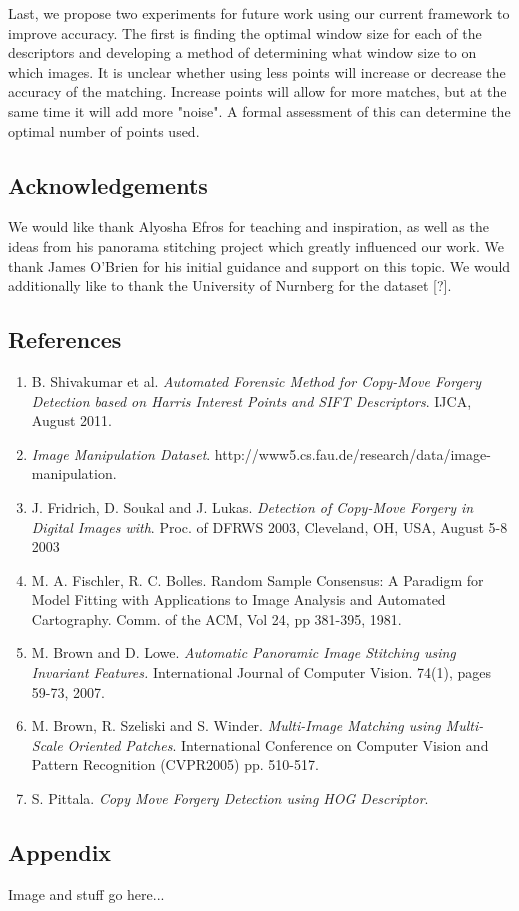 \documentclass[12pt]{article}
\begin{document}
Last, we propose two experiments for future work using our current framework to improve accuracy. The first is finding the optimal window size for each of the descriptors and developing a method of determining what window size to on which images. It is unclear whether using less points will increase or decrease the accuracy of the matching. Increase points will allow for more matches, but at the same time it will add more "noise". A formal assessment of this can determine the optimal number of points used. 

\subsection*{Acknowledgements}

We would like thank Alyosha Efros for teaching and inspiration, as well as the ideas from his panorama stitching project which greatly influenced our work. We thank James O'Brien for his initial guidance and support on this topic. We would additionally like to thank the University of Nurnberg for the dataset [?].

\subsection*{References}

\begin{enumerate}
\item B. Shivakumar et al. {\it Automated Forensic Method for Copy-Move Forgery Detection based on Harris Interest Points and SIFT Descriptors}. IJCA, August 2011. 
\item {\it Image Manipulation Dataset}. http://www5.cs.fau.de/research/data/image-manipulation. 
\item J. Fridrich, D. Soukal and J. Lukas. {\it Detection of Copy-Move Forgery in Digital Images with}. Proc. of DFRWS 2003, Cleveland, OH, USA, August 5-8 2003
\item M. A. Fischler, R. C. Bolles. Random Sample Consensus: A Paradigm for Model Fitting with Applications to Image Analysis and Automated Cartography. Comm. of the ACM, Vol 24, pp 381-395, 1981. 
\item M. Brown and D. Lowe. {\it Automatic Panoramic Image Stitching using Invariant Features.} International Journal of Computer Vision. 74(1), pages 59-73, 2007.
\item M. Brown, R. Szeliski and S. Winder. {\it Multi-Image Matching using Multi-Scale Oriented Patches}. International Conference on Computer Vision and Pattern Recognition (CVPR2005) pp. 510-517.
\item S. Pittala. {\it Copy Move Forgery Detection using HOG Descriptor}.
\end{enumerate}

\subsection*{Appendix}

Image and stuff go here...
\end{document}

